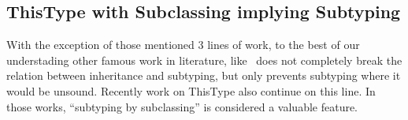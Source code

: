 


\subsection{ThisType with Subclassing implying Subtyping}
With the exception of those mentioned 3 lines of work, to the best of our understading
other famous work in literature, like~\cite{odersky2008programming,nystrom2006j}
does not completely break the relation between inheritance and subtyping, but only prevents subtyping where 
it would be unsound.
Recently work on ThisType \cite{Saito:2009,ryu16ThisType}
also continue on this line. In those works, ``subtyping by subclassing'' is considered a valuable feature.

